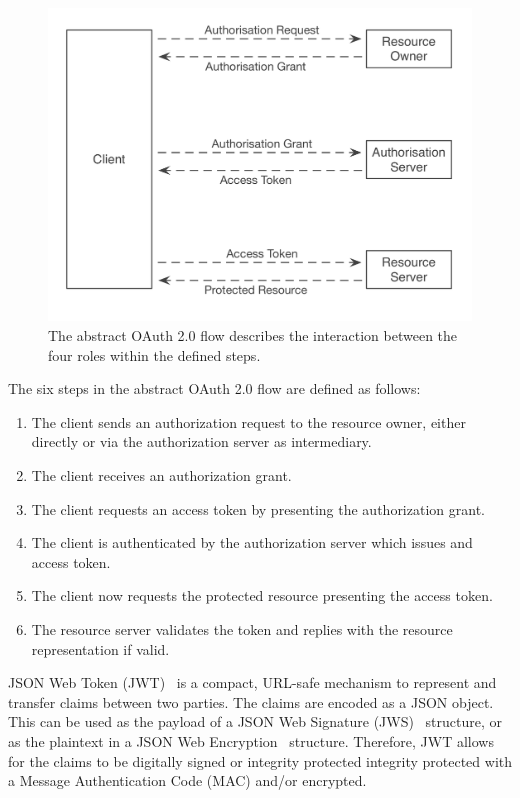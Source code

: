 \begin{figure}
\includegraphics[width=\textwidth]{figures/OAuth2Flow.png}
\caption[OAuth 2.0 Flow.]{The abstract OAuth 2.0 flow describes the interaction between the four roles within the defined steps.
\label{fig:oauth2flow}}
\end{figure}

The six steps in the abstract OAuth 2.0 flow are defined as follows:
\begin{enumerate}
    \item The client sends an authorization request to the resource owner, either directly or via the authorization server as intermediary.
    \item The client receives an authorization grant.
    \item The client requests an access token by presenting the authorization grant.
    \item The client is authenticated by the authorization server which issues and access token.
    \item The client now requests the protected resource presenting the access token.
    \item The resource server validates the token and replies with the resource representation if valid.
\end{enumerate}

JSON Web Token (JWT)~\cite{jones2015json} is a compact, URL-safe mechanism to represent and transfer claims between two parties. The claims are encoded as a JSON object. This can be used as the payload of a JSON Web Signature (JWS)~\cite{jones2014n} structure, or as the plaintext in a JSON Web Encryption~\cite{jones2015jwe} structure. Therefore, JWT allows for the claims to be digitally signed or integrity protected integrity protected with a Message Authentication Code (MAC) and/or encrypted.


